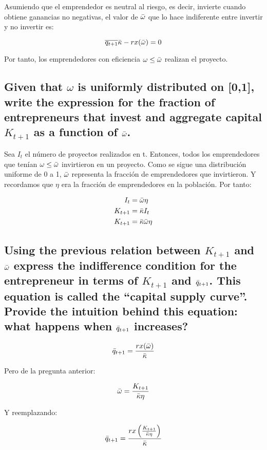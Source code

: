 \documentclass[12pt]{article}
\begin{document}
Asumiendo que el emprendedor es neutral al riesgo, es decir, invierte cuando obtiene ganancias no negativas, el valor de $\Bar{\omega}$ que lo hace indiferente entre invertir y no invertir es:

\[
\overline{q_{t+1}}\Bar{\kappa} - rx(\Bar{\omega}) = 0
\]

Por tanto, los emprendedores con eficiencia $\omega \leq \Bar{\omega}$ realizan el proyecto.

\subsection{ Given that $\omega$ is uniformly distributed on [0,1], write the expression for
the fraction of entrepreneurs that invest and aggregate capital $K_{t+1}$ as a
function of $\Bar{\omega}$.}

Sea $I_t$ el número de proyectos realizados en t. Entonces, todos los emprendedores que tenían $\omega \leq \Bar{\omega}$ invirtieron en un proyecto. Como se sigue una distribución uniforme de 0 a 1, $\Bar{\omega}$ representa la fracción de emprendedores que invirtieron. Y recordamos que $\eta$ era la fracción de emprendedores en la población. Por tanto:

\begin{align*}
    I_t &= \Bar{\omega}\eta \\
    K_{t+1} &= \Bar{\kappa} I_t \\
    K_{t+1} &= \Bar{\kappa} \Bar{\omega}\eta
\end{align*}

\subsection{ Using the previous relation between $K_{t+1}$ and $\Bar{\omega}$ express the indifference
condition for the entrepreneur in terms of $K_{t+1}$ and $\Bar{q}_{t+1}$. This equation
is called the “capital supply curve”. Provide the intuition behind this
equation: what happens when $\Bar{q}_{t+1}$ increases?}

\begin{align*}
    \Bar{q}_{t+1}= \frac{rx(\Bar{\omega})}{\Bar{\kappa}}
\end{align*}

Pero de la pregunta anterior:

\[
    \Bar{\omega} = \frac{K_{t+1}}{\Bar{\kappa} \eta} 
\]

Y reemplazando:

\begin{align}
\label{capital_supply_curve}
    \Bar{q}_{t+1}= \frac{rx \left ( \frac{K_{t+1}}{\Bar{\kappa} \eta} \right )}{\Bar{\kappa}}
\end{align}
\end{document}

